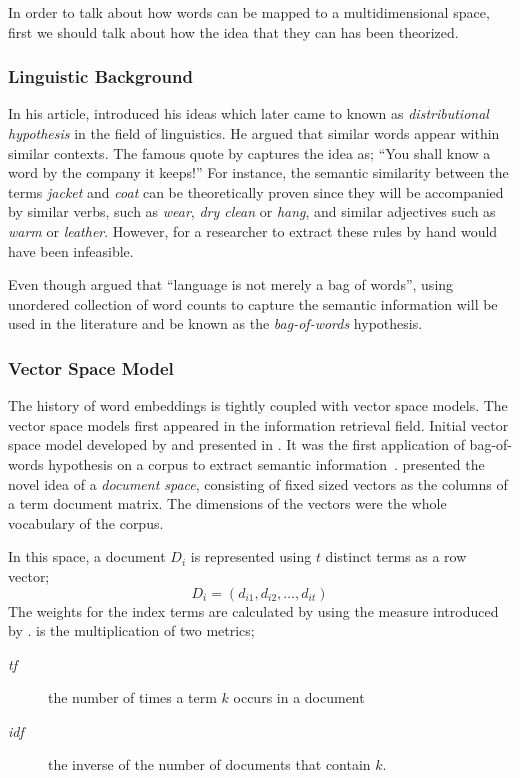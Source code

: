 In order to talk about how words can be mapped to a multidimensional space, first we should talk about how the idea that they can has been theorized.

\subsubsection{Linguistic Background}%
\label{ssub:linguistic_background}

In his \citeyear{harris_distributional_1954} article, \textcite{harris_distributional_1954} introduced his ideas which later came to known as \emph{distributional hypothesis} in the field of linguistics.
He argued that similar words appear within similar contexts.
The famous quote by \textcite{firth_synopsis_1957} captures the idea as;
\enquote{You shall know a word by the company it keeps!}
For instance, the semantic similarity between the terms \emph{jacket} and \emph{coat} can be theoretically proven since they will be accompanied by similar verbs, such as \emph{wear}, \emph{dry clean} or \emph{hang}, and similar adjectives such as \emph{warm} or \emph{leather}.
However, for a researcher to extract these rules by hand would have been infeasible.

Even though \citeauthor{harris_distributional_1954} argued that \enquote{language is not merely a bag of words}, using unordered collection of word counts to capture the semantic information will be used in the literature and be known as the \emph{bag-of-words} hypothesis.

\subsubsection{Vector Space Model}%
\label{ssub:vector_space_model}

The history of word embeddings is tightly coupled with vector space models.
The vector space models first appeared in the information retrieval field.
Initial vector space model developed by \textcite{salton_vector_1975} and presented in .
It was the first application of bag-of-words hypothesis on a corpus to extract semantic information~\cite{turney_frequency_2010}.
\citeauthor{salton_vector_1975} presented the novel idea of a \emph{document space}, consisting of fixed sized vectors as the columns of a term document matrix.
The dimensions of the vectors were the whole vocabulary of the corpus.

In this space, a document $D_i$ is represented using $t$ distinct terms as a row vector;
\begin{displaymath}
    D_{i} = (d_{i1}, d_{i2}, \ldots, d_{it})
\end{displaymath}
The weights for the index terms are calculated by using the \tfidf{} measure introduced by \textcite{jones_statistical_1972}.
\tfidf{} is the multiplication of two metrics;
\begin{description}
    \item[\emph{tf}] the number of times a term $k$ occurs in a document
    \item[\emph{idf}] the inverse of the number of documents that contain $k$.
\end{description}

